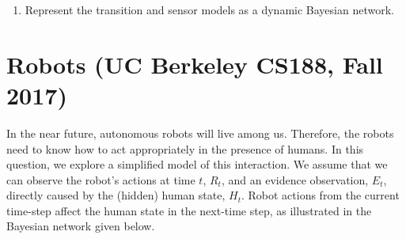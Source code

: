 \documentclass[11pt, a4paper]{article}
\begin{document}
\begin{enumerate}
    \item Represent the transition and sensor models as a dynamic Bayesian network.

    \begin{solution}
        \begin{figure}[H]
            \centering
        \end{figure}
    \end{solution}
\end{enumerate}

\newpage

\section{Robots (UC Berkeley CS188, Fall 2017)}

In the near future, autonomous robots will live among us. Therefore, the robots need to know how to act appropriately in the presence of humans. In this question, we explore a simplified model of this interaction. We assume that we can observe the robot's actions at time $t$, $R_t$, and an evidence observation, $E_t$, directly caused by the (hidden) human state, $H_t$. Robot actions from the current time-step affect the human state in the next-time step, as illustrated in the Bayesian network given below.
\end{document}

